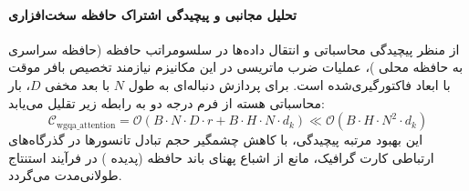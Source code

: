 \paragraph{تحلیل مجانبی و پیچیدگی اشتراک حافظه سخت‌افزاری}
از منظر پیچیدگی محاسباتی و انتقال داده‌ها در سلسومراتب حافظه (حافظه سراسری  به حافظه محلی )، عملیات ضرب ماتریسی در این مکانیزم نیازمند تخصیص بافر موقت با ابعاد فاکتورگیری‌شده است. برای پردازش دنباله‌ای به طول $N$ با بعد مخفی $D$، بار محاسباتی هسته از فرم درجه دو به رابطه زیر تقلیل می‌یابد:
\begin{equation}
\label{eq:complexity_wgqa_attention}
\mathcal{C}_{\text{wgqa\_attention}} = \mathcal{O}\left( B \cdot N \cdot D \cdot r + B \cdot H \cdot N \cdot d_k \right) \ll \mathcal{O}\left( B \cdot H \cdot N^2 \cdot d_k \right)
\end{equation}
این بهبود مرتبه پیچیدگی، با کاهش چشمگیر حجم تبادل تانسورها در گذرگاه‌های ارتباطی کارت گرافیک، مانع از اشباع پهنای باند حافظه (پدیده ) در فرآیند استنتاج طولانی‌مدت می‌گردد.
